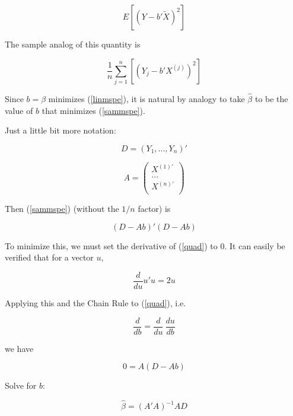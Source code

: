 \begin{equation}
\label{linmspe}
E \left [ (Y - b' \widetilde{X})^2 \right ]
\end{equation}

The sample analog of this quantity is

\begin{equation}
\label{sammspe}
\frac{1}{n}
\sum_{j=1}^n \left [ (Y_j - b' X^{(j)})^2 \right ]
\end{equation}

Since $b = \beta$ minimizes (\ref{linmspe}), it is natural by analogy to
take $\widehat{\beta}$ to be the value of $b$ that minimizes
(\ref{sammspe}).

Just a little bit more notation:

\begin{equation}
D = (Y_1,...,Y_n)'
\end{equation}

\begin{equation}
A = 
\left (
\begin{array}{r}
X^{(1)'} \\
... \\
X^{(n)'} \\
\end{array}
\right )
\end{equation}

Then (\ref{sammspe}) (without the $1/n$ factor) is

\begin{equation}
\label{quad}
(D - Ab)'(D - Ab)
\end{equation}

To minimize this, we must set the derivative of (\ref{quad}) to 0.  It
can easily be verified that for a vector $u$, 

\begin{equation}
\frac{d}{du} u'u = 2u
\end{equation}

Applying this and the Chain Rule to (\ref{quad}), i.e.

\begin{equation}
\frac{d}{db} = \frac{d}{du} ~ \frac{du}{db}
\end{equation}


we have

\begin{equation}
0 = A (D - Ab) 
\end{equation}

Solve for $b$:

\begin{equation}
\widehat{\beta} = (A'A)^{-1} AD
\end{equation}


